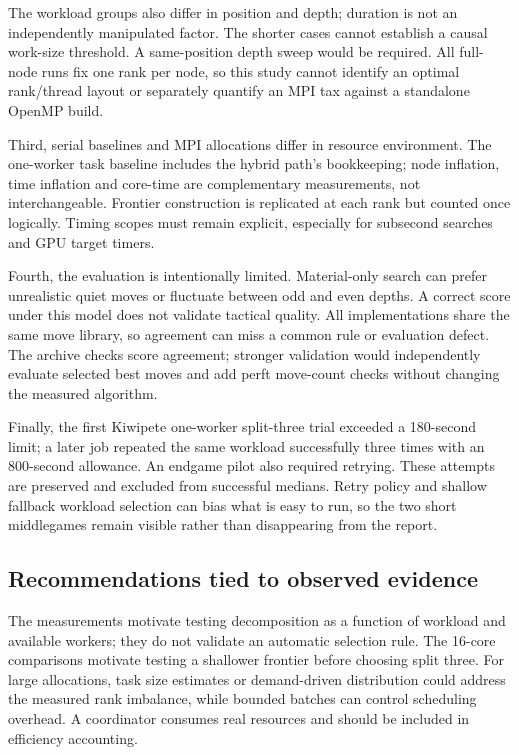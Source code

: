 \documentclass[11pt,a4paper]{article}
\begin{document}
The workload groups also differ in position and depth; duration is not an
independently manipulated factor. The shorter cases cannot establish a causal
work-size threshold. A same-position depth sweep would be required. All full-node
runs fix one rank per node, so this study cannot identify an optimal rank/thread
layout or separately quantify an MPI tax against a standalone OpenMP build.

Third, serial baselines and MPI allocations differ in resource environment.
The one-worker task baseline includes the hybrid path's bookkeeping; node
inflation, time inflation and core-time are complementary measurements, not
interchangeable. Frontier construction is replicated at each rank but counted
once logically. Timing scopes must remain explicit, especially for subsecond
searches and GPU target timers.

Fourth, the evaluation is intentionally limited. Material-only search can
prefer unrealistic quiet moves or fluctuate between odd and even depths.
A correct score under this model does not validate tactical quality. All
implementations share the same move library, so agreement can miss a common
rule or evaluation defect. The archive checks score agreement; stronger
validation would independently evaluate selected best moves and add perft
move-count checks without changing the measured algorithm.

Finally, the first Kiwipete one-worker split-three trial exceeded a 180-second
limit; a later job repeated the same workload successfully three times with an
800-second allowance. An endgame pilot also required retrying. These attempts
are preserved and excluded from successful medians. Retry policy and shallow
fallback workload selection can bias what is easy to run, so the two short
middlegames remain visible rather than disappearing from the report.

\subsection{Recommendations tied to observed evidence}
The measurements motivate testing decomposition as a function of workload and
available workers; they do not validate an automatic selection rule. The 16-core comparisons motivate testing a shallower frontier
before choosing split three. For large allocations, task size estimates or
demand-driven distribution could address the measured rank imbalance, while
bounded batches can control scheduling overhead. A coordinator consumes real
resources and should be included in efficiency accounting.
\end{document}
